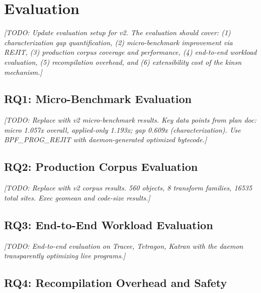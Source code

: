 \documentclass[sigconf,anonymous]{acmart}
\begin{document}
\section{Evaluation}
\label{sec:evaluation}


\textit{[TODO: Update evaluation setup for v2. The evaluation should
cover: (1) characterization gap quantification, (2) micro-benchmark
improvement via REJIT, (3) production corpus coverage and performance,
(4) end-to-end workload evaluation, (5) recompilation overhead, and
(6) extensibility cost of the kinsn mechanism.]}

\subsection{RQ1: Micro-Benchmark Evaluation}
\label{sec:eval_micro}

\textit{[TODO: Replace with v2 micro-benchmark results. Key data points
from plan doc: micro 1.057x overall, applied-only 1.193x; gap 0.609x
(characterization). Use BPF\_PROG\_REJIT with daemon-generated
optimized bytecode.]}

\subsection{RQ2: Production Corpus Evaluation}
\label{sec:eval_corpus}

\textit{[TODO: Replace with v2 corpus results. 560 objects, 8 transform
families, 16535 total sites. Exec geomean and code-size results.]}

\subsection{RQ3: End-to-End Workload Evaluation}
\label{sec:eval_e2e}

\textit{[TODO: End-to-end evaluation on Tracee, Tetragon, Katran with
the daemon transparently optimizing live programs.]}

\subsection{RQ4: Recompilation Overhead and Safety}
\label{sec:eval_overhead}
\end{document}
